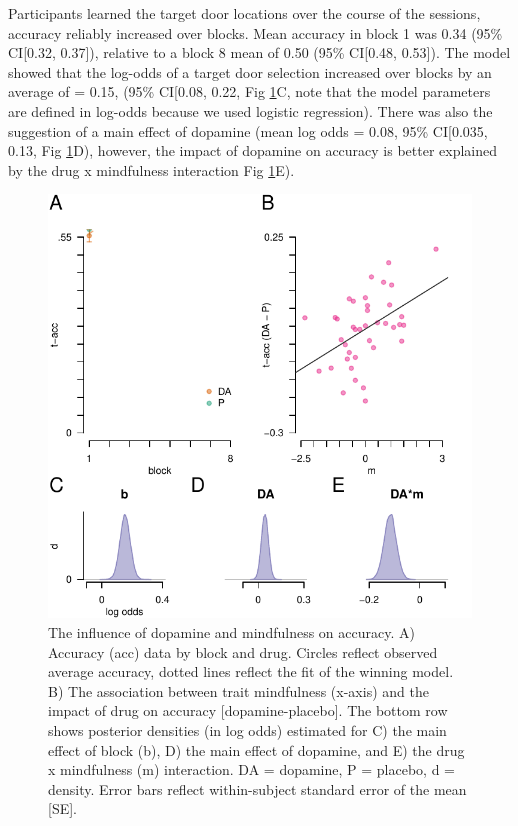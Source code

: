 \documentclass[
  man]{apa6}
\begin{document}
Participants learned the target door locations over the course of the sessions, accuracy reliably increased over blocks. Mean accuracy in block 1 was 0.34 (95\% CI{[}0.32, 0.37{]}), relative to a block 8 mean of 0.50 (95\% CI{[}0.48, 0.53{]}). The model showed that the log-odds of a target door selection increased over blocks by an average of = 0.15, (95\% CI{[}0.08, 0.22, Fig \ref{fig:accfig}C, note that the model parameters are defined in log-odds because we used logistic regression). There was also the suggestion of a main effect of dopamine (mean log odds = 0.08, 95\% CI{[}0.035, 0.13, Fig \ref{fig:accfig}D), however, the impact of dopamine on accuracy is better explained by the drug x mindfulness interaction Fig \ref{fig:accfig}E).

\begin{figure}

{\centering \includegraphics[width=0.7\linewidth]{../../images/acc_fig} 

}

\caption{The influence of dopamine and mindfulness on accuracy. A) Accuracy (acc) data by block and drug. Circles reflect observed average accuracy, dotted lines reflect the fit of the winning model. B) The association between trait mindfulness (x-axis) and the impact of drug on accuracy [dopamine-placebo]. The bottom row shows posterior densities (in log odds) estimated for C) the main effect of block (b), D) the main effect of dopamine, and E) the drug x mindfulness (m) interaction. DA = dopamine, P = placebo, d = density. Error bars reflect within-subject standard error of the mean [SE].}\label{fig:accfig}
\end{figure}
\end{document}
